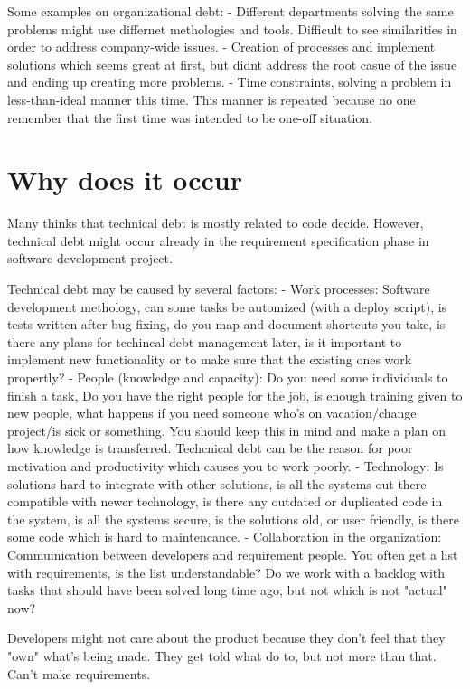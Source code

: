 Some examples on organizational debt:
- Different departments solving the same problems might use differnet methologies and tools. Difficult to see similarities in order to address company-wide issues.
- Creation of processes and implement solutions which seems great at first, but didnt address the root casue of the issue and ending up creating more problems.
- Time constraints, solving a problem in less-than-ideal manner this time. This manner is repeated because no one remember that the first time was intended to be one-off situation.


\section{Why does it occur}
Many thinks that technical debt is mostly related to code decide. However, technical debt might occur already in the requirement specification phase in software development project. 

Technical debt may be caused by several factors:
- Work processes: Software development methology, can some tasks be automized (with a deploy script), is tests written after bug fixing, do you map and document shortcuts you take, is there any plans for techincal debt management later, is it important to implement new functionality or to make sure that the existing ones work propertly?
- People (knowledge and capacity): Do you need some individuals to finish a task, Do you have the right people for the job, is enough training given to new people, what happens if you need someone who's on vacation/change project/is sick or something. You should keep this in mind and make a plan on how knowledge is transferred. Techcnical debt can be the reason for poor motivation and productivity which causes you to work poorly. 
- Technology: Is solutions hard to integrate with other solutions, is all the systems out there compatible with newer technology, is there any outdated or duplicated code in the system, is all the systems secure, is the solutions old, or user friendly, is there some code which is hard to maintencance. 
- Collaboration in the organization: Commuinication between developers and requirement people. You often get a list with requirements, is the list understandable? Do we work with a backlog with tasks that should have been solved long time ago, but not which is not "actual" now?

Developers might not care about the product because they don't feel that they "own" what's being made. They get told what do to, but not more than that. Can't make requirements.



